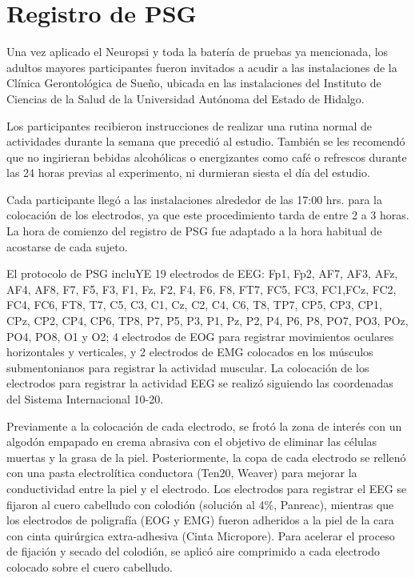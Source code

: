 
\section{Registro de PSG}

Una vez aplicado el Neuropsi y toda la bater\'ia de pruebas ya mencionada, los adultos mayores
participantes fueron invitados a acudir a las instalaciones de la Cl\'inica Gerontol\'ogica de 
Sue\~no, ubicada en las instalaciones del Instituto de Ciencias de la Salud de la Universidad 
Aut\'onoma del Estado de Hidalgo.


Los participantes recibieron instrucciones de realizar una rutina normal de actividades durante la 
semana que precedi\'o al estudio. Tambi\'en se les recomend\'o que no ingirieran bebidas 
alcoh\'olicas o energizantes como caf\'e o refrescos durante las 24 horas previas al experimento, 
ni durmieran siesta el d\'ia del estudio. 


Cada participante lleg\'o a las instalaciones alrededor de las 17:00 hrs. para la colocaci\'on de 
los electrodos, ya que este procedimiento tarda de entre 2 a 3 horas. La hora de comienzo del 
registro de PSG fue adaptado a la hora habitual de acostarse de cada sujeto.

El protocolo de PSG incluYE 19 electrodos de EEG: 
Fp1, Fp2, AF7, AF3, AFz, AF4, AF8, F7, F5, F3, F1, Fz, F2, F4, F6, F8, FT7, 
FC5, FC3, FC1,FCz, FC2, FC4, FC6, FT8, T7, C5, C3, C1, Cz, C2, C4, C6, T8, TP7, CP5, CP3, CP1,
CPz, CP2, CP4, CP6, TP8, P7, P5, P3, P1, Pz, P2, P4, P6, P8, PO7, PO3, POz, PO4, PO8, O1 y O2; 
4 electrodos de EOG para registrar movimientos oculares horizontales y verticales, 
y 2 electrodos de EMG colocados en los m\'usculos submentonianos para registrar la actividad 
muscular. 
La colocaci\'on de los electrodos para registrar la actividad EEG se realiz\'o siguiendo las 
coordenadas del Sistema Internacional 10-20\cite{Coleman87}.


Previamente a la colocaci\'on de cada electrodo, se frot\'o la zona de inter\'es con un algod\'on 
empapado en crema abrasiva con el objetivo de eliminar las c\'elulas muertas y la grasa de la piel.
Posteriormente, la copa de cada electrodo se rellen\'o con una pasta electrol\'itica 
conductora (Ten20\texttrademark, Weaver) para mejorar la conductividad  entre la piel y el 
electrodo. Los electrodos para registrar el EEG se fijaron al cuero cabelludo con colodi\'on 
(solución al 4\%, Panreac), mientras que los electrodos de poligraf\'ia (EOG y EMG) fueron 
adheridos a la piel de la cara con cinta quir\'urgica extra-adhesiva (Cinta 
Micropore\texttrademark). Para acelerar el proceso de fijaci\'on y secado del colodi\'on, se 
aplic\'o aire comprimido a cada electrodo colocado sobre el cuero cabelludo.


